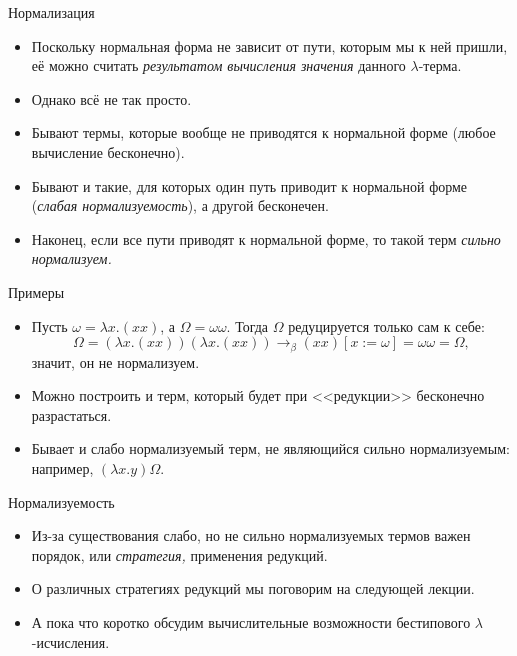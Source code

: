 \documentclass[xcolor=dvipsnames]{beamer}
\begin{document}
\begin{frame}{Нормализация}

\begin{itemize}[<+->]
 \item Поскольку нормальная форма не зависит от пути, которым мы к ней пришли, её можно считать {\em результатом вычисления значения} данного $\lambda$-терма.
 
 \item Однако всё не так просто.
 
 \item Бывают термы, которые вообще не приводятся к нормальной форме (любое вычисление бесконечно).
 
 \item Бывают и такие, для которых один путь приводит к нормальной форме ({\em слабая нормализуемость}), а другой бесконечен.
 
 \item Наконец, если все пути приводят к нормальной форме, то такой терм {\em сильно нормализуем.}
\end{itemize}

 
\end{frame}

\begin{frame}{Примеры}

\begin{itemize}
 \item Пусть $\omega = \lambda x. (xx)$, а $\Omega = \omega\omega$. Тогда $\Omega$ редуцируется только сам к себе: 
 \[\Omega = (\lambda x.(xx)) (\lambda x. (xx)) \to_\beta (xx)[x := \omega] = \omega\omega = \Omega,\]
 значит, он не нормализуем.
 \item Можно построить и терм, который будет при <<редукции>> бесконечно разрастаться.
 \item Бывает и слабо нормализуемый терм, не являющийся сильно нормализуемым: например, $(\lambda x . y) \Omega$.
\end{itemize}

 
\end{frame}


\begin{frame}{Нормализуемость}

\begin{itemize}[<+->]
 \item Из-за существования слабо, но не сильно нормализуемых термов важен порядок, или {\em стратегия,} применения редукций.
 \item О различных стратегиях редукций мы поговорим на следующей лекции.
 \item А пока что коротко обсудим вычислительные возможности бестипового $\lambda$-исчисления.
\end{itemize}

 
\end{frame}
\end{document}
